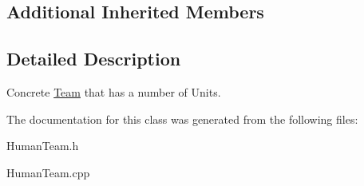 \subsection*{Additional Inherited Members}


\subsection{Detailed Description}
Concrete \hyperlink{class_team}{Team} that has a number of Units. 

The documentation for this class was generated from the following files\+:\begin{DoxyCompactItemize}
\item 
Human\+Team.\+h\item 
Human\+Team.\+cpp\end{DoxyCompactItemize}
